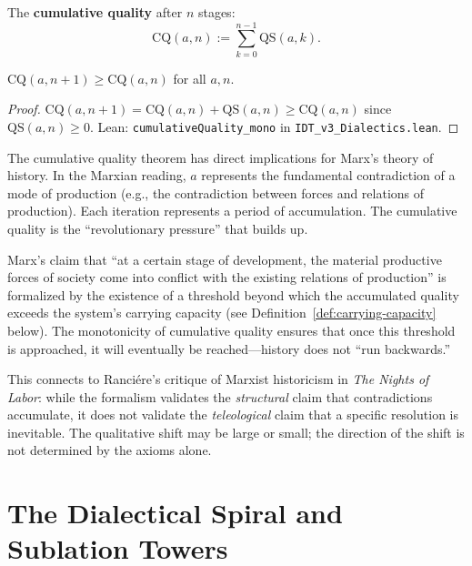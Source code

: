 \begin{definition}
\label{def:cumulative-quality}
The \textbf{cumulative quality} after $n$ stages:
\[
\mathrm{CQ}(a, n) := \sum_{k=0}^{n-1} \mathrm{QS}(a, k).
\]
\end{definition}

\begin{theorem}
\label{thm:cumulative-mono}
$\mathrm{CQ}(a, n+1) \geq \mathrm{CQ}(a, n)$ for all $a, n$.
\end{theorem}

\begin{proof}
$\mathrm{CQ}(a, n+1) = \mathrm{CQ}(a, n) + \mathrm{QS}(a, n) \geq
\mathrm{CQ}(a, n)$ since $\mathrm{QS}(a, n) \geq 0$.
Lean: \texttt{cumulativeQuality\_mono} in \texttt{IDT\_v3\_Dialectics.lean}.
\end{proof}

\begin{interpretation}
The cumulative quality theorem has direct implications for Marx's theory of
history. In the Marxian reading, $a$ represents the fundamental contradiction
of a mode of production (e.g., the contradiction between forces and relations
of production). Each iteration represents a period of accumulation. The
cumulative quality is the ``revolutionary pressure'' that builds up.

Marx's claim that ``at a certain stage of development, the material productive
forces of society come into conflict with the existing relations of
production'' is formalized by the existence of a threshold beyond which the
accumulated quality exceeds the system's carrying capacity (see
Definition~\ref{def:carrying-capacity} below). The monotonicity of cumulative
quality ensures that once this threshold is approached, it will eventually be
reached---history does not ``run backwards.''

This connects to Ranciére's critique of Marxist historicism in
\textit{The Nights of Labor}: while the formalism validates the
\emph{structural} claim that contradictions accumulate, it does not validate
the \emph{teleological} claim that a specific resolution is inevitable.
The qualitative shift may be large or small; the direction of the shift is
not determined by the axioms alone.
\end{interpretation}

\section{The Dialectical Spiral and Sublation Towers}

